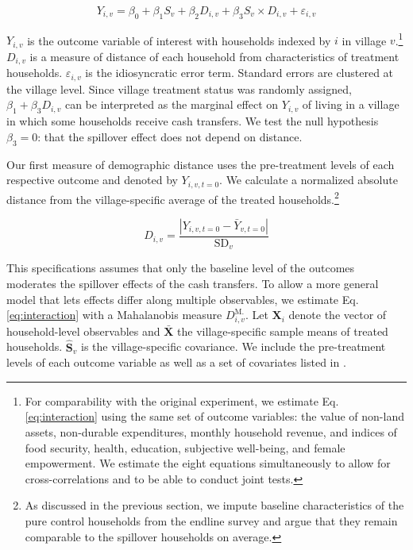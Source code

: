 \documentclass[11pt]{article}
\begin{document}
            \begin{equation} \label{eq:interaction}
            Y_{i,v} = \beta_0 + \beta_1 S_v + \beta_2 D_{i,v} + \beta_3 S_v \times  D_{i,v} + \varepsilon_{i,v}
            \end{equation}

        $Y_{i,v}$ is the outcome variable of interest with households indexed by $i$ in village $v$.\footnote{For comparability with the original experiment, we estimate Eq. \ref{eq:interaction} using the same set of outcome variables: the value of non-land assets, non-durable expenditures, monthly household revenue, and indices of food security, health, education, subjective well-being, and female empowerment. We estimate the eight equations simultaneously to allow for cross-correlations and to be able to conduct joint tests.} $D_{i,v}$ is a measure of distance of each household from characteristics of treatment households. $\varepsilon_{i,v}$ is the idiosyncratic error term. Standard errors are clustered at the village level. Since village treatment status was randomly assigned, $\beta_1 + \beta_3 D_{i,v}$ can be interpreted as the marginal effect on $Y_{i,v}$ of living in a village in which some households receive cash transfers. We test the null hypothesis $\beta_3 = 0$: that the spillover effect does not depend on distance.

        Our first measure of demographic distance uses the pre-treatment levels of each respective outcome and denoted by $Y_{i,v,t=0}$. We calculate a normalized absolute distance from the village-specific average of the treated households.\footnote{As discussed in the previous section, we impute baseline characteristics of the pure control households from the endline survey and argue that they remain comparable to the spillover households on average.}

            \begin{equation} \label{eq:absdev}
            D_{i,v} = \frac{|Y_{i,v,t=0} - \bar Y_{v,t=0}|}{\text{SD}_v}
            \end{equation}


        This specifications assumes that only the baseline level of the outcomes moderates the spillover effects of the cash transfers. To allow a more general model that lets effects differ along multiple observables, we estimate Eq. \ref{eq:interaction} with a Mahalanobis measure $D^\text{M.}_{i,v}$. Let $\mathbf X_i$ denote the vector of household-level observables and $\mathbf{\bar X}$ the village-specific sample means of treated households. $\mathbf{\hat S}_v$ is the village-specific covariance. We include the pre-treatment levels of each outcome variable as well as a set of covariates listed in \textcite{haushofer_short-term_2016}.
\end{document}
